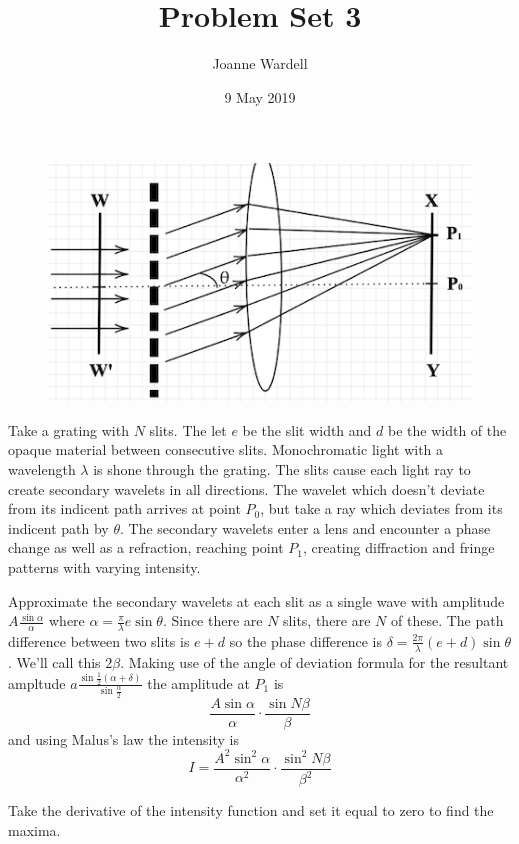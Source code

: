 \documentclass[12pt]{article}
\title{Problem Set 3}
\author{\vspace{-2.0cm}Joanne Wardell}
\date{9 May 2019}
\begin{document}
\maketitle

\begin{figure}[!h]
\includegraphics{pic1.png}
\end{figure}

Take a grating with $N$ slits. The let $e$ be the slit width and $d$ be the width of the opaque material between consecutive slits. Monochromatic light with a wavelength $\lambda$ is shone through the grating. The slits cause each light ray to create secondary wavelets in all directions. The wavelet which doesn't deviate from its indicent path arrives at point $P_{0}$, but take a ray which deviates from its indicent path by $\theta$. The secondary wavelets enter a lens and encounter a phase change as well as a refraction, reaching point $P_{1}$, creating diffraction and fringe patterns with varying intensity.

Approximate the secondary wavelets at each slit as a single wave with amplitude $A\frac{\sin{\alpha}}{\alpha}$ where $\alpha = \frac{\pi}{\lambda}e\sin{\theta}$. Since there are $N$ slits, there are $N$ of these. The path difference between two slits is $e + d$ so the phase difference is $\delta = \frac{2\pi}{\lambda}(e+d)\sin{\theta}$. We'll call this $2\beta$. Making use of the angle of deviation formula for the resultant ampltude $a\frac{\sin{\frac{1}{2}(\alpha + \delta)}}{\sin{\frac{\alpha}{2}}}$ the amplitude at $P_{1}$ is \\
\[\frac{A\sin{\alpha}}{\alpha}\cdot\frac{\sin{N \beta}}{\beta}\]
and using Malus's law the intensity is 
\[I = \frac{A^{2}\sin^{2}{\alpha}}{\alpha^{2}}\cdot\frac{\sin^{2}{N \beta}}{\beta^{2}}\]

Take the derivative of the intensity function and set it equal to zero to find the maxima.
\end{document}
